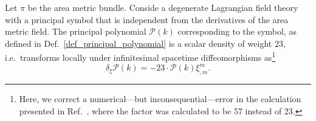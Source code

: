 \begin{theorem}\label{thm_poly_trafo}
  Let $\pi$ be the area metric bundle. Conside a degenerate Lagrangian field theory with a principal symbol that is independent from the derivatives of the area metric field. The principal polynomial $\mathcal P(k)$ corresponding to the symbol, as defined in Def.~\ref{def_principal_polynomial} is a scalar density of weight 23, i.e.~transforms locally under infinitesimal spacetime diffeomorphisms as\footnote{Here, we correct a numerical---but inconsequential---error in the calculation presented in Ref.~\cite{paper}, where the factor was calculated to be 57 instead of 23.}
  \begin{equation}
    \delta_\xi \mathcal P(k) = -23 \cdot \mathcal P(k) \xi^m_{,m}.
  \end{equation}
\end{theorem}

